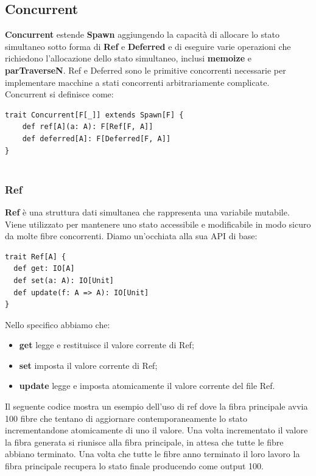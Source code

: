 \subsection{Concurrent}
\textbf{Concurrent} estende \textbf{Spawn} aggiungendo la capacità di allocare lo stato simultaneo sotto forma di \textbf{Ref} e \textbf{Deferred} e di eseguire varie operazioni che richiedono l'allocazione dello stato simultaneo, inclusi \textbf{memoize} e \textbf{parTraverseN}. Ref e Deferred sono le primitive concorrenti necessarie per implementare macchine a stati concorrenti arbitrariamente complicate. Concurrent si definisce come:
\begin{verbatim}
trait Concurrent[F[_]] extends Spawn[F] {
    def ref[A](a: A): F[Ref[F, A]]
    def deferred[A]: F[Deferred[F, A]]
}
   
\end{verbatim}

\subsubsection{Ref}
\textbf{Ref} è una struttura dati simultanea che rappresenta una variabile mutabile. Viene utilizzato per mantenere uno stato accessibile e modificabile in modo sicuro da molte fibre concorrenti. Diamo un'occhiata alla sua API di base:
\begin{verbatim}
trait Ref[A] {
  def get: IO[A]
  def set(a: A): IO[Unit]
  def update(f: A => A): IO[Unit]
}
\end{verbatim}

\noindent Nello specifico abbiamo che:
\begin{itemize}
    \item \textbf{get} legge e restituisce il valore corrente di Ref;
    \item  \textbf{set} imposta il valore corrente di Ref;
    \item  \textbf{update} legge e imposta atomicamente il valore corrente del file Ref.
\end{itemize}

\noindent Il seguente codice mostra un esempio dell'uso di ref dove la fibra principale avvia 100 fibre che tentano di aggiornare contemporaneamente lo stato incrementandone atomicamente di uno il valore. Una volta incrementato il valore la fibra generata si riunisce alla fibra principale, in attesa che tutte le fibre abbiano terminato. Una volta che tutte le fibre anno terminato il loro lavoro la fibra principale recupera lo stato finale producendo come output 100. 

